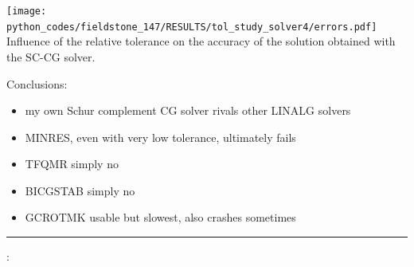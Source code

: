 \begin{center}
\texttt{[image: python\_codes/fieldstone\_147/RESULTS/tol\_study\_solver4/errors.pdf]}\\
{\captionfont Influence of the relative tolerance on the accuracy of the solution obtained 
with the SC-CG solver.}
\end{center}

Conclusions:

\begin{itemize}
\item my own Schur complement CG solver rivals other LINALG solvers 
\item MINRES, even with very low tolerance, ultimately fails
\item TFQMR simply no
\item BICGSTAB simply no
\item GCROTMK usable but slowest, also crashes sometimes
\end{itemize}



\par\noindent\rule{\textwidth}{0.4pt}

\vspace{.5cm}

\begin{center}
\end{center}

\vspace{.5cm}

\Literature:\\







